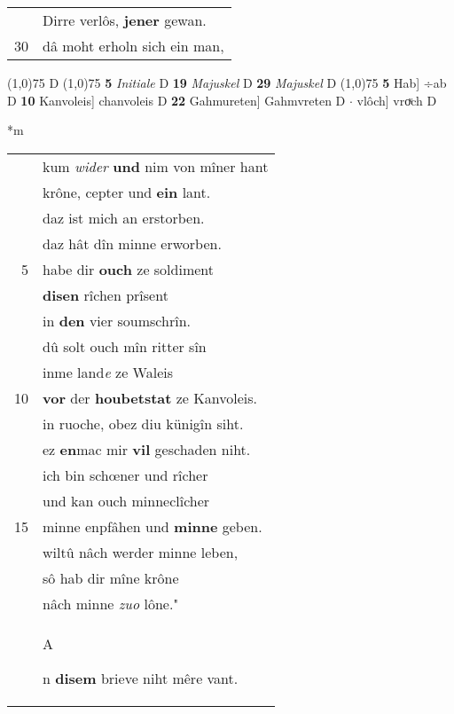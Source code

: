 \documentclass[8pt,a4paper,notitlepage]{article}
\begin{document}
\begin{table}[ht]
\begin{minipage}[t]{0.5\linewidth}
\begin{tabular}{rl}
 & Dirre verlôs, \textbf{jener} gewan.\\ 
30 & dâ moht erholn sich ein man,\\ 
\end{tabular}
\scriptsize
\line(1,0){75} \newline
D \newline
\line(1,0){75} \newline
\textbf{5} \textit{Initiale} D  \textbf{19} \textit{Majuskel} D  \textbf{29} \textit{Majuskel} D  \newline
\line(1,0){75} \newline
\textbf{5} Hab] ÷ab D \textbf{10} Kanvoleis] chanvoleis D \textbf{22} Gahmureten] Gahmvreten D  $\cdot$ vlôch] vroͮch D \newline
\end{minipage}
\hspace{0.5cm}
\begin{minipage}[t]{0.5\linewidth}
\small
\begin{center}*m
\end{center}
\begin{tabular}{rl}
 & kum \textit{wider} \textbf{und} nim von mîner hant\\ 
 & krône, cepter und \textbf{ein} lant.\\ 
 & daz ist mich an erstorben.\\ 
 & daz hât dîn minne erworben.\\ 
5 & habe dir \textbf{ouch} ze soldiment\\ 
 & \textbf{disen} rîchen prîsent\\ 
 & in \textbf{den} vier soumschrîn.\\ 
 & dû solt ouch mîn ritter sîn\\ 
 & inme land\textit{e} ze Waleis\\ 
10 & \textbf{vor} der \textbf{houbetstat} ze Kanvoleis.\\ 
 & in ruoche, obez diu künigîn siht.\\ 
 & ez \textbf{en}mac mir \textbf{vil} geschaden niht.\\ 
 & ich bin schœner und rîcher\\ 
 & und kan ouch minneclîcher\\ 
15 & minne enpfâhen und \textbf{minne} geben.\\ 
 & wiltû nâch werder minne leben,\\ 
 & sô hab dir mîne krône\\ 
 & nâch minne \textit{zuo} lône."\\ 
 & \begin{large}A\end{large}n \textbf{disem} brieve  niht mêre vant.\\ 

\end{tabular}
\end{minipage}
\end{table}
\end{document}
